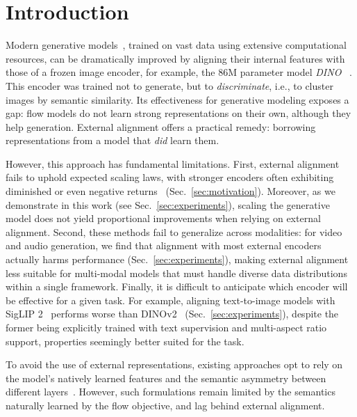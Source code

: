 \section{Introduction}
\label{sec:intro}


Modern generative models~\citep{ldm,dit,sit, sd3}, trained on vast data using extensive computational resources, can be dramatically improved by aligning their internal features with those of a frozen image encoder, for example, the 86M parameter model \emph{DINO} ~\citep{repa}. This encoder was trained not to generate, but to \emph{discriminate}, i.e., to cluster images by semantic similarity. Its effectiveness for generative modeling exposes a gap: flow models do not learn strong representations on their own, although they help generation. External alignment offers a practical remedy: borrowing representations from a model that \emph{did} learn them. 

However, this approach has fundamental limitations. First, external alignment fails to uphold expected scaling laws, with stronger encoders often exhibiting diminished or even negative returns~\citep{irepa} (Sec.~\ref{sec:motivation}). Moreover, as we demonstrate in this work (see Sec.~\ref{sec:experiments}), scaling the generative model does not yield proportional improvements when relying on external alignment. Second, these methods fail to generalize across modalities: for video and audio generation, we find that alignment with most external encoders actually harms performance (Sec.~\ref{sec:experiments}), making external alignment less suitable for multi-modal models that must handle diverse data distributions within a single framework. Finally, it is difficult to anticipate which encoder will be effective for a given task. For example, aligning text-to-image models with SigLIP 2~\citep{siglip2} performs worse than DINOv2~\citep{dinov2} (Sec.~\ref{sec:experiments}), despite the former being explicitly trained with text supervision and multi-aspect ratio support, properties seemingly better suited for the task.

To avoid the use of external representations, existing approaches opt to rely on the model's natively learned features and the semantic asymmetry between different layers~\citep{sra,haghighi2025layersyncselfaligningintermediatelayers}. However, such formulations remain limited by the semantics naturally learned by the flow objective, and lag behind external alignment. 

